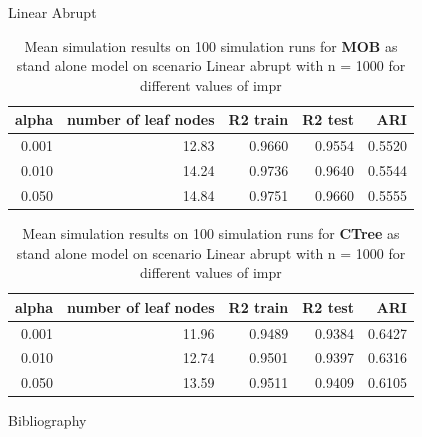 \documentclass[9pt, xcolor=table]{beamer}
\begin{document}
\begin{frame}{Linear Abrupt}

\begin{table}

\caption{Mean simulation results on 100 simulation runs for \textbf{MOB} as stand alone model on scenario Linear abrupt with n = 1000 for different values of impr }
\centering
\begin{tabular}[t]{r|r|r|r|r}
\hline
alpha & number of leaf nodes & R2 train & R2 test & ARI\\
\hline
0.001 & 12.83 & 0.9660 & 0.9554 & 0.5520\\
\hline
0.010 & 14.24 & 0.9736 & 0.9640 & 0.5544\\
\hline
0.050 & 14.84 & 0.9751 & 0.9660 & 0.5555\\
\hline
\end{tabular}
\end{table}  

\begin{table}

\caption{Mean simulation results on 100 simulation runs for \textbf{CTree} as stand alone model on scenario Linear abrupt with n = 1000 for different values of impr }
\centering
\begin{tabular}[t]{r|r|r|r|r}
\hline
alpha & number of leaf nodes & R2 train & R2 test & ARI\\
\hline
0.001 & 11.96 & 0.9489 & 0.9384 & 0.6427\\
\hline
0.010 & 12.74 & 0.9501 & 0.9397 & 0.6316\\
\hline
0.050 & 13.59 & 0.9511 & 0.9409 & 0.6105\\
\hline
\end{tabular}
\end{table}
\end{frame}


\begin{frame}{Bibliography}
    
    

\end{frame}
\end{document}
